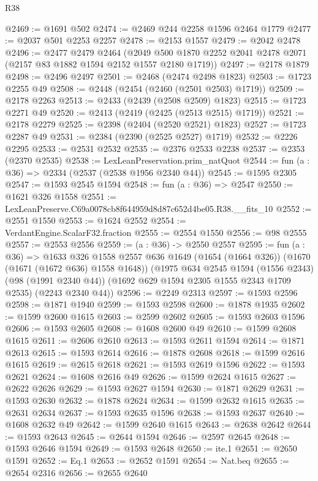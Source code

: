 \begin{lexlean}{R38}
\begin{coremodule}
@2469 := @1691 @502
@2474 := @2469 @244 @2258 @1596 @2464 @1779
@2477 := @2037 @501 @2253 @2257
@2478 := @2153 @1557
@2479 := @2042 @2478
@2496 := @2477
    @2479
    @2464
    (@2049 @500 @1870 @2252 @2041 @2478 @2071 (@2157 @83 @1882 @1594 @2152 @1557 @2180 @1719))
@2497 := @2178 @1879
@2498 := @2496 @2497
@2501 := @2468 (@2474 @2498 @1823)
@2503 := @1723 @2255 @49
@2508 := @2448 (@2454 (@2460 (@2501 @2503) @1719))
@2509 := @2178 @2263
@2513 := @2433 (@2439 (@2508 @2509) @1823)
@2515 := @1723 @2271 @49
@2520 := @2413 (@2419 (@2425 (@2513 @2515) @1719))
@2521 := @2178 @2279
@2525 := @2398 (@2404 (@2520 @2521) @1823)
@2527 := @1723 @2287 @49
@2531 := @2384 (@2390 (@2525 @2527) @1719)
@2532 := @2226 @2295
@2533 := @2531 @2532
@2535 := @2376 @2533 @2238
@2537 := @2353 (@2370 @2535)
@2538 := LexLeanPreservation.prim_natQuot
@2544 := fun (a : @36) => @2334 (@2537 (@2538 @1956 @2340 @44))
@2545 := @1595 @2305
@2547 := @1593 @2545 @1594
@2548 := fun (a : @36) => @2547
@2550 := @1621 @326 @1558
@2551 := LexLeanPreserve.C69a0078cb8f644959d8d87c652d4be05.R38.__fits_10
@2552 := @2551 @1550
@2553 := @1624 @2552
@2554 := VerdantEngine.ScalarF32.fraction
@2555 := @2554 @1550
@2556 := @98 @2555
@2557 := @2553 @2556
@2559 := (a : @36) -> @2550 @2557
@2595 := fun (a : @36) =>
  @1633
    @326
    @1558
    @2557
    @636
    @1649
    (@1654 (@1664 @326))
    (@1670 (@1671 (@1672 @636) @1558 @1648))
    (@1975
      @634
      @2545
      @1594
      (@1556 @2343)
      (@98 (@1991 @2340 @44))
      (@1692 @629 @1594 @2305 @1555 @2343 @1709 @2535)
      (@2243 @2340 @44))
@2596 := @2249 @2313
@2597 := @1593 @2596
@2598 := @1871 @1940
@2599 := @1593 @2598
@2600 := @1878 @1935
@2602 := @1599 @2600 @1615
@2603 := @2599 @2602
@2605 := @1593 @2603 @1596
@2606 := @1593 @2605
@2608 := @1608 @2600 @49
@2610 := @1599 @2608 @1615
@2611 := @2606 @2610
@2613 := @1593 @2611 @1594
@2614 := @1871 @2613
@2615 := @1593 @2614
@2616 := @1878 @2608
@2618 := @1599 @2616 @1615
@2619 := @2615 @2618
@2621 := @1593 @2619 @1596
@2622 := @1593 @2621
@2624 := @1608 @2616 @49
@2626 := @1599 @2624 @1615
@2627 := @2622 @2626
@2629 := @1593 @2627 @1594
@2630 := @1871 @2629
@2631 := @1593 @2630
@2632 := @1878 @2624
@2634 := @1599 @2632 @1615
@2635 := @2631 @2634
@2637 := @1593 @2635 @1596
@2638 := @1593 @2637
@2640 := @1608 @2632 @49
@2642 := @1599 @2640 @1615
@2643 := @2638 @2642
@2644 := @1593 @2643
@2645 := @2644 @1594
@2646 := @2597 @2645
@2648 := @1593 @2646 @1594
@2649 := @1593 @2648
@2650 := ite.{1}
@2651 := @2650 @1591
@2652 := Eq.{1}
@2653 := @2652 @1591
@2654 := Nat.beq
@2655 := @2654 @2316
@2656 := @2655 @2640

\end{coremodule}
\end{lexlean}
